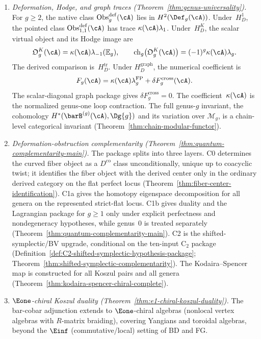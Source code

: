 \begin{enumerate}[label=\emph{(\arabic*)}]
\item \emph{Deformation, Hodge, and graph traces
 (Theorem~\ref{thm:genus-universality}).}
 For $g\geq2$, the native class
 $\operatorname{Obs}^{\mathrm{def}}_g(\cA)$ lies in
 $H^2(\Def_g(\cA))$.  Under~$H_D^1$, the pointed class
 $\operatorname{Obs}^{\mathrm{def}}_{1,1}(\cA)$ has trace
 $\kappa(\cA)\lambda_1$.  Under~$H_D^K$, the scalar virtual object and
 its Hodge image are
 \[
  \mathfrak O_g^K(\cA)=\kappa(\cA)\lambda_{-1}(\mathbb E_g),
  \qquad
  \operatorname{ch}_g\!\left(\mathfrak O_g^K(\cA)\right)
  =(-1)^g\kappa(\cA)\lambda_g.
 \]
 The derived comparison is~$H_D^{\mathrm{tr}}$.  Under
 $H_D^{\mathrm{graph}}$, the numerical coefficient is
 \[
  F_g(\cA)=\kappa(\cA)\lambda_g^{\mathrm{FP}}
  +\delta F_g^{\mathrm{cross}}(\cA).
 \]
 The scalar-diagonal graph package gives
 $\delta F_g^{\mathrm{cross}}=0$.  The coefficient~$\kappa(\cA)$ is
 the normalized genus-one loop contraction.
 The full genus-$g$ invariant, the cohomology
 $H^*(\barB^{(g)}(\cA), \Dg{g})$ and its variation over
 $\mathcal{M}_g$, is a chain-level categorical invariant
 (Theorem~\ref{thm:chain-modular-functor}).

\item \emph{Deformation-obstruction complementarity
 (Theorem~\ref{thm:quantum-complementarity-main}).}
 The package splits into three layers. C0 determines the curved
 fiber object as a $D^{\mathrm{co}}$ class unconditionally, unique up
 to coacyclic twist; it identifies the fiber object with the derived
 center only in the ordinary derived category on the flat perfect locus
 \textup{(}Theorem~\ref{thm:fiber-center-identification}\textup{)}.
 C1a gives the homotopy eigenspace decomposition for all genera on
 the represented strict-flat locus. C1b gives duality and the
 Lagrangian package for $g \geq 1$ only under explicit perfectness
 and nondegeneracy hypotheses, while genus~$0$ is treated separately
 \textup{(}Theorem~\ref{thm:quantum-complementarity-main}\textup{)}.
 C2 is the shifted-symplectic/BV upgrade, conditional on the
 ten-input $\mathrm{C}_2$ package
 \textup{(}Definition~\ref{def:C2-shifted-symplectic-hypothesis-package};
 Theorem~\ref{thm:shifted-symplectic-complementarity}\textup{)}.
 The Kodaira--Spencer map is constructed for all Koszul pairs
 and all genera
 \textup{(}Theorem~\ref{thm:kodaira-spencer-chiral-complete}\textup{)}.

\item \emph{$\Eone$-chiral Koszul duality
 (Theorem~\ref{thm:e1-chiral-koszul-duality}).}
 The bar-cobar adjunction extends to $\Eone$-chiral algebras
 (nonlocal vertex algebras with $R$-matrix braiding), covering
 Yangians and toroidal algebras, beyond the
 $\Einf$ (commutative/local) setting of BD and FG.


\end{enumerate}
